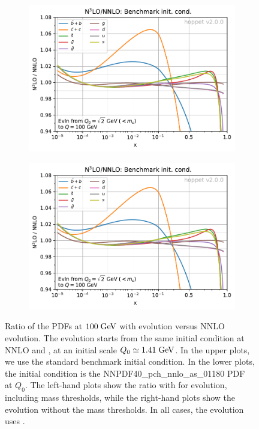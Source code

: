\begin{figure}[p]
\begin{subfigure}{0.49\textwidth}
    \centering
    \includegraphics[width=\textwidth,page=4]{figs-v2/n3lo_k_factors.pdf}\\[-1.5ex]
    \caption{}
    \label{fig:n3lok-nnpdf40-mtm}
  \end{subfigure}
  \begin{subfigure}{0.49\textwidth}
    \centering
    \includegraphics[width=\textwidth,page=6]{figs-v2/n3lo_k_factors.pdf}\\[-1.5ex]
    \caption{}
    \label{fig:n3lok-nnpdf40-nomtm}
  \end{subfigure}
  \caption{Ratio of the PDFs at $100\;\mathrm{GeV}$ with \ntlo evolution versus
    NNLO evolution.
    The evolution starts from the same initial condition
    at NNLO and \ntlo, at an initial scale
    $Q_0\simeq 1.41\;\mathrm{GeV}$.
    In the upper plots, we use the standard benchmark initial
    condition.
    In the lower plots, the initial condition is the
    NNPDF40\_pch\_nnlo\_as\_01180 PDF~\cite{NNPDF:2021njg} at $Q_0$.
    The left-hand plots show the ratio with for \ntlo evolution,
    including \ntlo mass thresholds, while the right-hand plots show
    the evolution without the \ntlo mass thresholds.
    In all cases, the \ntlo evolution uses
    .  }
  \label{fig:n3lo-v-nnlo-ev}
\end{figure}

